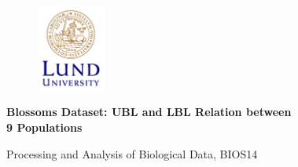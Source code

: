 \documentclass{article}
\begin{document}
\begin{figure}
    \includegraphics[width=0.2\textwidth]{LundUniversity_C2line_RGB.png}
\end{figure}

        \Large
        \textbf{Blossoms Dataset: UBL and LBL Relation between\\ 9 Populations}
        
        \Large
        Processing and Analysis of Biological Data, BIOS14
        
\end{document}
